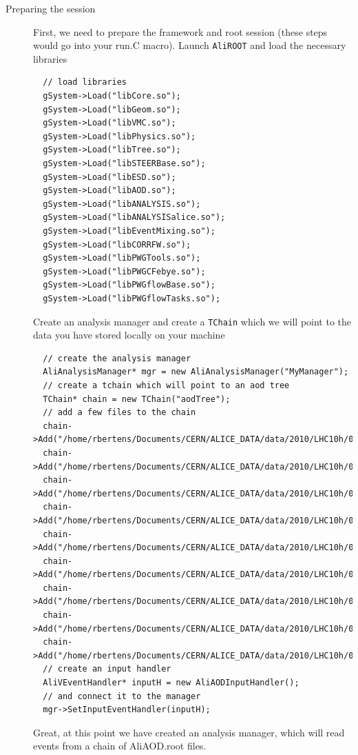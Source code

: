 \documentclass[a4paper]{book}
\numberwithin{equation}{subsection}
\begin{document}
\begin{description}
\item [Preparing the session] First, we need to prepare the framework and root session (these steps would go into your run.C macro). Launch \texttt{AliROOT} and load the necessary libraries
\begin{lstlisting}
  // load libraries
  gSystem->Load("libCore.so");        
  gSystem->Load("libGeom.so");
  gSystem->Load("libVMC.so");
  gSystem->Load("libPhysics.so");
  gSystem->Load("libTree.so");
  gSystem->Load("libSTEERBase.so");
  gSystem->Load("libESD.so");
  gSystem->Load("libAOD.so");
  gSystem->Load("libANALYSIS.so");
  gSystem->Load("libANALYSISalice.so");
  gSystem->Load("libEventMixing.so");
  gSystem->Load("libCORRFW.so");
  gSystem->Load("libPWGTools.so");
  gSystem->Load("libPWGCFebye.so");
  gSystem->Load("libPWGflowBase.so");
  gSystem->Load("libPWGflowTasks.so"); \end{lstlisting}
Create an analysis manager and create a \texttt{TChain} which we will point to the data you have stored locally on your machine
\begin{lstlisting}
  // create the analysis manager
  AliAnalysisManager* mgr = new AliAnalysisManager("MyManager");
  // create a tchain which will point to an aod tree
  TChain* chain = new TChain("aodTree");
  // add a few files to the chain
  chain->Add("/home/rbertens/Documents/CERN/ALICE_DATA/data/2010/LHC10h/000139510/ESDs/pass2/AOD086/0003/AliAOD.root");
  chain->Add("/home/rbertens/Documents/CERN/ALICE_DATA/data/2010/LHC10h/000139510/ESDs/pass2/AOD086/0003/AliAOD.root");
  chain->Add("/home/rbertens/Documents/CERN/ALICE_DATA/data/2010/LHC10h/000139510/ESDs/pass2/AOD086/0004/AliAOD.root");
  chain->Add("/home/rbertens/Documents/CERN/ALICE_DATA/data/2010/LHC10h/000139510/ESDs/pass2/AOD086/0005/AliAOD.root");
  chain->Add("/home/rbertens/Documents/CERN/ALICE_DATA/data/2010/LHC10h/000139510/ESDs/pass2/AOD086/0006/AliAOD.root");
  chain->Add("/home/rbertens/Documents/CERN/ALICE_DATA/data/2010/LHC10h/000139510/ESDs/pass2/AOD086/0007/AliAOD.root");
  chain->Add("/home/rbertens/Documents/CERN/ALICE_DATA/data/2010/LHC10h/000139510/ESDs/pass2/AOD086/0008/AliAOD.root");
  chain->Add("/home/rbertens/Documents/CERN/ALICE_DATA/data/2010/LHC10h/000139510/ESDs/pass2/AOD086/0009/AliAOD.root");
  chain->Add("/home/rbertens/Documents/CERN/ALICE_DATA/data/2010/LHC10h/000139510/ESDs/pass2/AOD086/0010/AliAOD.root");
  // create an input handler
  AliVEventHandler* inputH = new AliAODInputHandler();
  // and connect it to the manager
  mgr->SetInputEventHandler(inputH);\end{lstlisting}
Great, at this point we have created an analysis manager, which will read events from a chain of AliAOD.root files. 
  

\end{description}
\end{document}
